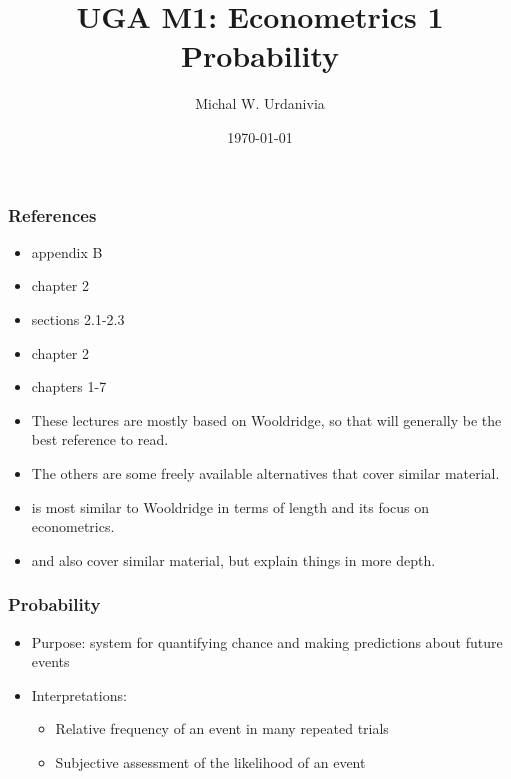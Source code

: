 


\title[Econometrics 1: Introduction]{UGA M1: Econometrics 1\\ \textbf{Probability}}
\date{\today}
\author{Michal W. Urdanivia\inst{*}}




\frame{\titlepage}

\begin{frame}
  \tableofcontents  
\end{frame}

\begin{frame}\frametitle{References}
  \begin{itemize}
  \item \cite{w2013} appendix B
  \item \cite{sw2009} chapter 2
  \item \cite{abbring2001} sections 2.1-2.3
  \item \cite{dbc2012} chapter 2 
  \item \cite{gs2003} chapters 1-7
  \end{itemize}

\begin{itemize}
\item These lectures are mostly based on Wooldridge, so that will
generally be the best reference to read. 
\item The others are some
freely available alternatives that cover similar
material. 
\item \cite{abbring2001} is most similar to Wooldridge in
terms of length and its focus on econometrics. 
\item \cite{dbc2012} and
\cite{gs2003} also cover similar material, but explain things in
more depth.
\end{itemize}
\end{frame}

\begin{frame}[allowframebreaks] \frametitle{Probability}
  \begin{itemize}
  \item Purpose: system for quantifying chance and making predictions
    about future events 
  \item Interpretations:
    \begin{itemize}
    \item Relative frequency of an event in many repeated trials
    \item Subjective assessment of the likelihood of an event
    \end{itemize}
  \end{itemize}
\end{frame}

